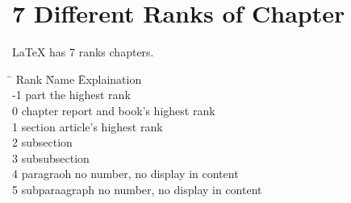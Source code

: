 


\chapter[Chapter]{7 Different Ranks of Chapter}
    LaTeX has 7 ranks chapters. 
    \begin{tabbing}
        \qquad \=\+ Rank \qquad \= Name \qquad \= Explaination \\
        \vspace{5cm}
                    -1 \>          part \>        the highest rank \\
                    0 \>           chapter \>     report and book's highest rank \\
                    1 \>           section \>     article's highest rank \\
                    2 \>           subsection \\
                    3 \>           subsubsection \\
                    4 \>           paragraoh \>   no number, no display in content \\
                    5 \>           subparaagraph \> no number, no display in content
    \end{tabbing}
